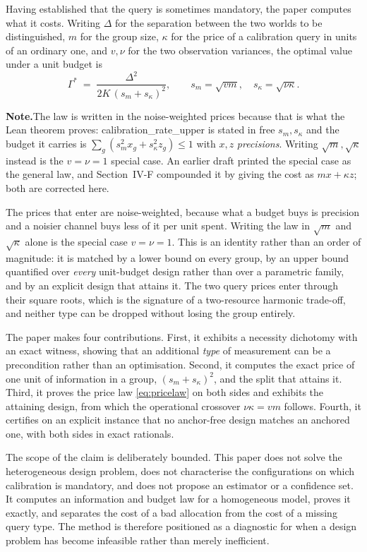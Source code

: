 \documentclass[conference]{IEEEtran}
\theoremstyle{definition}
\newcommand{\lean}[1]{\textsf{\footnotesize #1}}
\newif\ifshownotes\shownotestrue
\newcommand{\NOTEPAR}[1]{\ifshownotes\par\vspace{2pt}\noindent%
  {\color{notecol}\textsf{\footnotesize\textbf{Note.}\;#1}}\par\vspace{2pt}\fi}
\begin{document}
Having established that the query is sometimes mandatory, the paper computes what it costs.
Writing $\Delta$ for the separation between the two worlds to be distinguished, $m$ for the
group size, $\kappa$ for the price of a calibration query in units of an ordinary one, and
$v,\nu$ for the two observation variances, the optimal value under a unit budget is
\begin{equation}
\Gamma^{*} \;=\; \frac{\Delta^{2}}{2K\,(s_{m}+s_{\kappa})^{2}},
\qquad s_{m}=\sqrt{vm},\quad s_{\kappa}=\sqrt{\nu\kappa} .
\label{eq:pricelaw}
\end{equation}
\NOTEPAR{The law is written in the noise-weighted prices because that is what the Lean
theorem proves: \lean{calibration\_rate\_upper} is stated in free $s_{m},s_{\kappa}$ and the
budget it carries is $\sum_{g}(s_{m}^{2}x_{g}+s_{\kappa}^{2}z_{g})\le1$ with $x,z$
\emph{precisions}. Writing $\sqrt{m},\sqrt{\kappa}$ instead is the $v=\nu=1$ special case. An
earlier draft printed the special case as the general law, and Section~IV-F compounded it by
giving the cost as $mx+\kappa z$; both are corrected here.}
The prices that enter are noise-weighted, because what a budget buys is precision and a
noisier channel buys less of it per unit spent. Writing the law in $\sqrt{m}$ and
$\sqrt{\kappa}$ alone is the special case $v=\nu=1$.
This is an identity rather than an order of magnitude: it is matched by a lower bound on
every group, by an upper bound quantified over \emph{every} unit-budget design rather than
over a parametric family, and by an explicit design that attains it. The two query prices
enter through their square roots, which is the signature of a two-resource harmonic
trade-off, and neither type can be dropped without losing the group entirely.

The paper makes four contributions. First, it exhibits a necessity dichotomy with an exact
witness, showing that an additional \emph{type} of measurement can be a precondition rather
than an optimisation. Second, it computes the exact price of one unit of information in a
group, $(s_{m}+s_{\kappa})^{2}$, and the split that attains it. Third, it proves the
price law \eqref{eq:pricelaw} on both sides and exhibits the attaining design, from which
the operational crossover $\nu\kappa=vm$ follows. Fourth, it certifies on an explicit instance
that no anchor-free design matches an anchored one, with both sides in exact rationals.

The scope of the claim is deliberately bounded. This paper does not solve the heterogeneous
design problem, does not characterise the configurations on which calibration is mandatory,
and does not propose an estimator or a confidence set. It computes an information and
budget law for a homogeneous model, proves it exactly, and separates the cost of a bad
allocation from the cost of a missing query type. The method is therefore positioned as a
diagnostic for when a design problem has become infeasible rather than merely inefficient.
\end{document}
